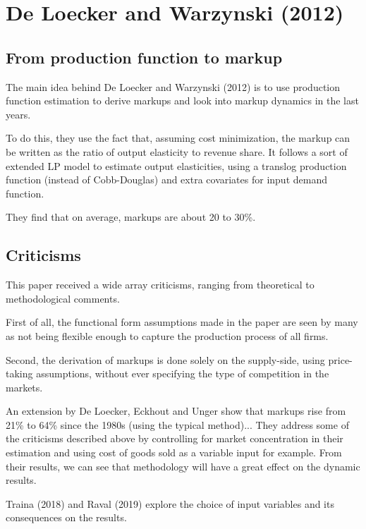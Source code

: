 \section{De Loecker and Warzynski (2012)}

\subsection{From production function to markup}

The main idea behind De Loecker and Warzynski (2012) is to use production function estimation to derive markups and look into markup dynamics in the last years. 

To do this, they use the fact that, assuming cost minimization, the markup can be written as the ratio of output elasticity to revenue share. It follows a sort of extended LP model to estimate output elasticities, using a translog production function (instead of Cobb-Douglas) and extra covariates for input demand function.

They find that on average, markups are about 20 to 30\%.

\subsection{Criticisms}

This paper received a wide array criticisms, ranging from theoretical to methodological comments.

First of all, the functional form assumptions made in the paper are seen by many as not being flexible enough to capture the production process of all firms.

Second, the derivation of markups is done solely on the supply-side, using price-taking assumptions, without ever specifying the type of competition in the markets.

An extension by De Loecker, Eckhout and Unger show that markups rise from 21\% to 64\% since the 1980s (using the typical method)... They address some of the criticisms described above by controlling for market concentration in their estimation and using cost of goods sold as a variable input for example. From their results, we can see that methodology will have a great effect on the dynamic results.

Traina (2018) and Raval (2019) explore the choice of input variables and its consequences on the results.